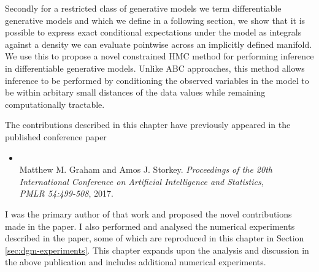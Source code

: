 Secondly for a restricted class of generative models we term differentiable generative models and which we define in a following section, we show that it is possible to express exact conditional expectations under the model as integrals against a density we can evaluate pointwise across an implicitly defined manifold. We use this to propose a novel constrained \ac{HMC} method for performing inference in differentiable generative models. Unlike \ac{ABC} approaches, this method allows inference to be performed by conditioning the observed variables in the model to be within arbitary small distances of the data values while remaining computationally tractable.

The contributions described in this chapter have previously appeared in the published conference paper
\begin{itemize}
 \item {}\\ Matthew M. Graham and Amos J. Storkey. \emph{Proceedings of the 20th International Conference on Artificial Intelligence and Statistics, \\PMLR 54:499-508}, 2017.
\end{itemize}
I was the primary author of that work and proposed the novel contributions made in the paper. I also performed and analysed the numerical experiments described in the paper, some of which are reproduced in this chapter in Section \ref{sec:dgm-experiments}. This chapter expands upon the analysis and discussion in the above publication and includes additional numerical experiments.





